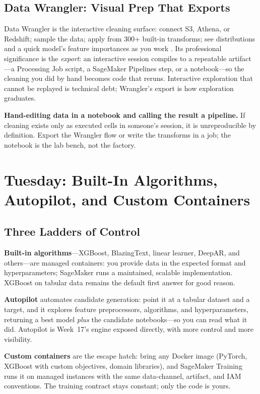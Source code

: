 \subsection{Data Wrangler: Visual Prep That Exports}
Data Wrangler is the interactive cleaning surface: connect S3, Athena, or Redshift; sample the data; apply from 300+ built-in transforms; see distributions and a quick model's feature importances as you work \cite{awsSageMakerDocs}. Its professional significance is the \emph{export}: an interactive session compiles to a repeatable artifact---a Processing Job script, a SageMaker Pipelines step, or a notebook---so the cleaning you did by hand becomes code that reruns. Interactive exploration that cannot be replayed is technical debt; Wrangler's export is how exploration graduates.

\begin{pitfall}
\textbf{Hand-editing data in a notebook and calling the result a pipeline.} If cleaning exists only as executed cells in someone's session, it is unreproducible by definition. Export the Wrangler flow or write the transforms in a job; the notebook is the lab bench, not the factory.
\end{pitfall}

\section{Tuesday: Built-In Algorithms, Autopilot, and Custom Containers}
\subsection{Three Ladders of Control}
\textbf{Built-in algorithms}---XGBoost, BlazingText, linear learner, DeepAR, and others---are managed containers: you provide data in the expected format and hyperparameters; SageMaker runs a maintained, scalable implementation. XGBoost on tabular data remains the default first answer for good reason.

\textbf{Autopilot} automates candidate generation: point it at a tabular dataset and a target, and it explores feature preprocessors, algorithms, and hyperparameters, returning a best model \emph{plus} the candidate notebooks---so you can read what it did. Autopilot is Week~17's engine exposed directly, with more control and more visibility.

\textbf{Custom containers} are the escape hatch: bring any Docker image (PyTorch, XGBoost with custom objectives, domain libraries), and SageMaker Training runs it on managed instances with the same data-channel, artifact, and IAM conventions. The training contract stays constant; only the code is yours.

